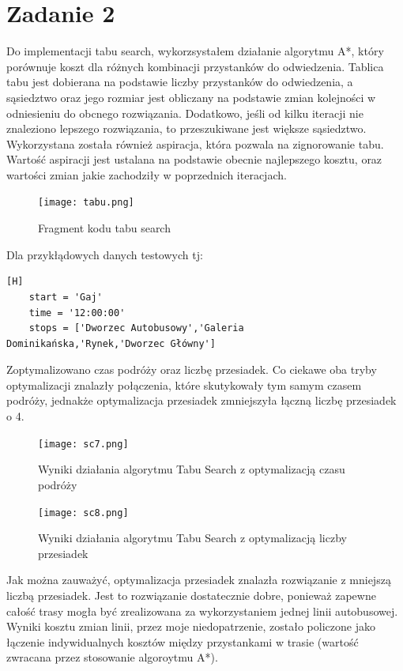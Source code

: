 \documentclass{article}
\begin{document}
\section{Zadanie 2}
Do implementacji tabu search, wykorzsystałem działanie algorytmu A*, który porównuje koszt dla różnych kombinacji przystanków do odwiedzenia.
Tablica tabu jest dobierana na podstawie liczby przystanków do odwiedzenia, a sąsiedztwo oraz jego rozmiar jest obliczany na podstawie zmian kolejności w odniesieniu do obcnego rozwiązania.
Dodatkowo, jeśli od kilku iteracji nie znaleziono lepszego rozwiązania, to przeszukiwane jest większe sąsiedztwo. Wykorzystana została również aspiracja, która pozwala na
zignorowanie tabu. Wartość aspiracji jest ustalana na podstawie obecnie najlepszego kosztu, oraz wartości zmian jakie zachodziły w poprzednich iteracjach.
\begin{figure}[H]

    \centering
    \texttt{[image: tabu.png]}
    \caption{Fragment kodu tabu search}
\end{figure}


Dla przykłądowych danych testowych tj:
\begin{verbatim}[H]
    start = 'Gaj'
    time = '12:00:00'
    stops = ['Dworzec Autobusowy','Galeria Dominikańska,'Rynek,'Dworzec Główny']
\end{verbatim}
Zoptymalizowano czas podróży oraz liczbę przesiadek. Co ciekawe oba tryby optymalizacji znalazły połączenia, które
skutykowały tym samym czasem podróży, jednakże optymalizacja przesiadek zmniejszyła łączną liczbę przesiadek o 4.

\begin{figure}[H]

    \centering
    \texttt{[image: sc7.png]}
    \caption{Wyniki działania algorytmu Tabu Search z optymalizacją czasu podróży}
\end{figure}

\begin{figure}[H]
    \centering
    \texttt{[image: sc8.png]}
    \caption{Wyniki działania algorytmu Tabu Search z optymalizacją liczby przesiadek}
\end{figure}

Jak można zauważyć, optymalizacja przesiadek znalazła rozwiązanie z mniejszą liczbą przesiadek. Jest to rozwiązanie dostatecznie dobre, ponieważ zapewne całość trasy mogła być zrealizowana
za wykorzystaniem jednej linii autobusowej. Wyniki kosztu zmian linii, przez moje niedopatrzenie, zostało policzone jako łączenie indywidualnych kosztów między przystankami w trasie (wartość zwracana przez stosowanie
algoroytmu A*).
\end{document}
